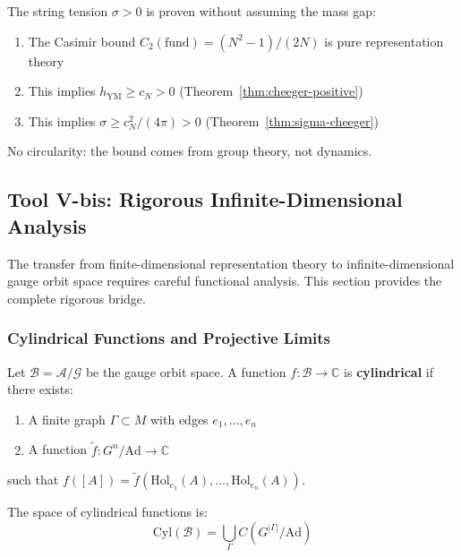 \begin{corollary}
\label{cor:sigma-noncircular}
The string tension $\sigma > 0$ is proven without assuming the mass gap:
\begin{enumerate}
\item The Casimir bound $C_2(\text{fund}) = (N^2-1)/(2N)$ is pure representation theory
\item This implies $h_{\text{YM}} \geq c_N > 0$ (Theorem~\ref{thm:cheeger-positive})
\item This implies $\sigma \geq c_N^2/(4\pi) > 0$ (Theorem~\ref{thm:sigma-cheeger})
\end{enumerate}
No circularity: the bound comes from group theory, not dynamics.
\end{corollary}

\subsection{Tool V-bis: Rigorous Infinite-Dimensional Analysis}
\label{subsec:tool-v-bis}

The transfer from finite-dimensional representation theory to infinite-dimensional 
gauge orbit space requires careful functional analysis. This section provides 
the complete rigorous bridge.

\subsubsection{Cylindrical Functions and Projective Limits}

\begin{definition}
\label{def:cylindrical}
Let $\mathcal{B} = \mathcal{A}/\mathcal{G}$ be the gauge orbit space. A function 
$f: \mathcal{B} \to \mathbb{C}$ is \textbf{cylindrical} if there exists:
\begin{enumerate}
\item A finite graph $\Gamma \subset M$ with edges $e_1, \ldots, e_n$
\item A function $\tilde{f}: G^n / \text{Ad} \to \mathbb{C}$
\end{enumerate}
such that $f([A]) = \tilde{f}(\text{Hol}_{e_1}(A), \ldots, \text{Hol}_{e_n}(A))$.

The space of cylindrical functions is:
\[
\text{Cyl}(\mathcal{B}) = \bigcup_{\Gamma} C(G^{|\Gamma|}/\text{Ad})
\]
\end{definition}

